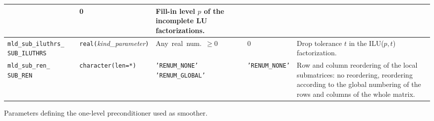 \begin{center}
\begin{tabular}{|p{3.5cm}|l|p{3.2cm}|l|p{5cm}|}
                         & 0
                         & Fill-in level $p$ of the incomplete LU factorizations. \\ \hline
\verb|mld_sub_iluthrs_| \break \verb|SUB_ILUTHRS|  & \verb|real(|\emph{kind\_parameter}\verb|)|
                         & Any~real~num.~$\ge 0$
                         & 0
                         & Drop tolerance $t$ in the ILU($p,t$) factorization. \\ \hline
\verb|mld_sub_ren_| \break \verb|SUB_REN|   & \verb|character(len=*)|
                         & \texttt{'RENUM\_NONE'}  \texttt{'RENUM\_GLOBAL'} %
                         & \texttt{'RENUM\_NONE'}
                         & Row and column reordering of the local submatrices: no reordering,
                           reordering according to the global numbering of the rows and columns of
                           the whole matrix. \\
\hline
\end{tabular}
\end{center}
\caption{Parameters defining the one-level preconditioner used as smoother.
\label{tab:p_smoother}}  
\esideways
                   
